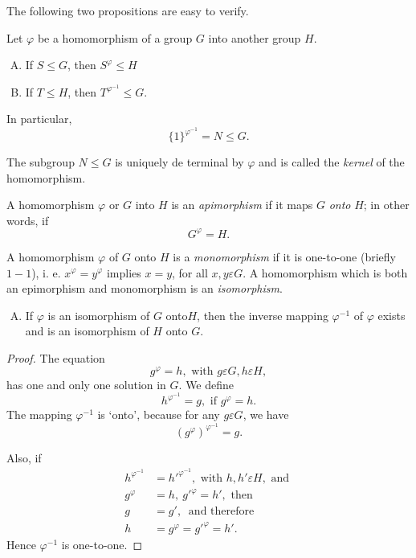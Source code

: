 The following two propositions are easy to verify.

Let $\varphi$ be a homomorphism of a group $G$ into another group $H$.
\begin{enumerate}[(A)]
\item If $S \leq G$, then $S^\varphi \leq H$
\item If $T \leq H$, then $T^{\varphi^{-1}} \leq G$.
\end{enumerate}

In particular,
$$
\big\{ 1 \big\}^{\varphi^{-1}} = N \leq G.
$$

The subgroup $N \leq G$ is uniquely de terminal by $\varphi$ and is
called the \textit{kernel} of the homomorphism. 

A homomorphism $\varphi$ or $G$ into $H$ is an \textit{apimorphism} if
it maps $G$ \textit{onto} $H$; in other words, if  
$$
G^\varphi = H.
$$

A homomorphism $\varphi$ of $G$ onto $H$ is a \textit{monomorphism} if
it is one-to-one (briefly $1-1$), i. e. $x^\varphi = y^\varphi$
implies $x = y$, for all $x, y \varepsilon G$. A homomorphism which is
both an epimorphism and monomorphism is an \textit{isomorphism}. 
\begin{enumerate}[(C)]
\item If $\varphi$ is an isomorphism of $G$ onto$H$, then the inverse
  mapping $\varphi^{-1}$ of $\varphi$ exists and is an isomorphism of
  $H$ onto $G$.  
\end{enumerate}

\begin{proof}
  The equation
  $$
  g^\varphi = h, \text{ with } g \varepsilon G, h \varepsilon H,
  $$
  has one and only one solution in $G$. We define
  $$
  h^{\varphi^{-1}} = g, \text{ if } g^\varphi = h.
  $$
  The mapping $\varphi^{-1}$ is `onto', because for any $g \varepsilon
  G$, we have  
  $$
  (g^\varphi)^{\varphi^{-1}} = g.
  $$

  Also, if
  \begin{align*}
    h^{\varphi^{-1}} & = h'^{\varphi^{-1}}, \text{ with } h, h'
    \varepsilon H, \text{ and }\\ 
    g^\varphi & = h, ~ g'^\varphi = h', \text{ then } \\
    g & = g', ~\text{ and therefore } \\
    h & = g^\varphi = g'^\varphi = h'.
  \end{align*}
  Hence $\varphi^{-1}$ is one-to-one.
\end{proof}

